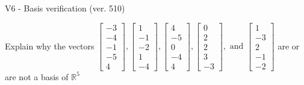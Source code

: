 \begin{exercise}
  \begin{exerciseTitle}V6 - Basis verification (ver. 510)\end{exerciseTitle}
  \begin{exerciseStatement}
    Explain why the vectors \(\left[\begin{array}{r}
-3 \\
-4 \\
-1 \\
-5 \\
4
\end{array}\right] , \left[\begin{array}{r}
1 \\
-1 \\
-2 \\
1 \\
-4
\end{array}\right] , \left[\begin{array}{r}
4 \\
-5 \\
0 \\
-4 \\
4
\end{array}\right] , \left[\begin{array}{r}
0 \\
2 \\
2 \\
3 \\
-3
\end{array}\right] , \text{ and } \left[\begin{array}{r}
1 \\
-3 \\
2 \\
-1 \\
-2
\end{array}\right]\) are or are not a basis of \(\mathbb{R}^5\)	



\end{exerciseStatement}
\end{exercise}
